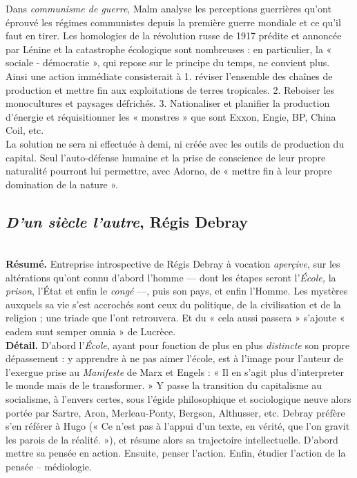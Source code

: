 \documentclass[11pt]{amsart}
\begin{document}
Dans \textsl{communisme de guerre}, Malm analyse les perceptions guerrières qu'ont éprouvé les régimes communistes depuis la première guerre mondiale et ce qu'il faut en tirer. Les homologies de la révolution russe de 1917 prédite et annoncée par Lénine et la catastrophe écologique sont nombreuses : en particulier, la « sociale - démocratie », qui repose sur le principe du temps, ne convient plus. Ainsi une action immédiate consisterait à 1. réviser l'ensemble des chaînes de production et mettre fin aux exploitations de terres tropicales. 2. Reboiser les monocultures et paysages défrichés. 3. Nationaliser et planifier la production d'énergie et réquisitionner les « monstres » que sont Exxon, Engie, BP, China Coil, etc. \\

La solution ne sera ni effectuée à demi, ni créée avec les outils de production du capital. Seul l'auto-défense humaine et la prise de conscience de leur propre naturalité pourront lui permettre, avec Adorno, de « mettre fin à leur propre domination de la nature ».

\newpage 

\subsection*{\textsl{D'un siècle l'autre}, Régis Debray}$ $\\

\textbf{Résumé.} Entreprise introspective de Régis Debray à vocation \textit{aperçive}, sur les altérations qu'ont connu d'abord l'homme — dont les étapes seront l'\textit{\'Ecole,} la \textit{prison}, l'{\'Etat} et enfin le \textit{congé} —, puis son pays, et enfin l'Homme. Les mystères auxquels sa vie s'est accrochés sont ceux du politique, de la civilisation et de la religion ; une triade que l'ont retrouvera. Et du « cela aussi passera » s'ajoute « eadem sunt semper omnia » de Lucrèce. \\

\textbf{Détail.} D'abord l'\textsl{\'Ecole}, ayant pour fonction de plus en plus \textit{distincte} son propre dépassement : y apprendre à ne pas aimer l'école, est à l'image pour l'auteur de l'exergue prise au \textsl{Manifeste} de Marx et Engels : « Il en s'agit plus d'interpreter le monde mais de le transformer. » Y passe la transition du capitalisme au socialisme, à l'envers certes, sous l'égide philosophique et sociologique neuve alors portée par Sartre, Aron, Merleau-Ponty, Bergson, Althusser, etc. Debray préfère s'en référer à Hugo (« Ce n'est pas à l'appui d'un texte, en vérité, que l'on gravit les parois de la réalité. »), et résume alors sa trajectoire intellectuelle. D'abord mettre sa pensée en action. Ensuite, penser l'action. Enfin, étudier l'action de la pensée – médiologie.
\end{document}
